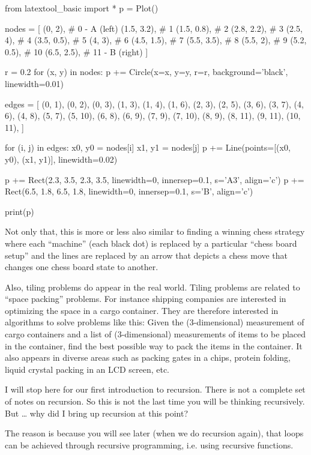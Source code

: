 \begin{python}
from latextool_basic import *
p = Plot()

nodes = [
    (0, 2),      # 0 - A (left)
    (1.5, 3.2),  # 1
    (1.5, 0.8),  # 2
    (2.8, 2.2),  # 3
    (2.5, 4),    # 4
    (3.5, 0.5),  # 5
    (4, 3),      # 6
    (4.5, 1.5),  # 7
    (5.5, 3.5),  # 8
    (5.5, 2),    # 9
    (5.2, 0.5),  # 10
    (6.5, 2.5),  # 11 - B (right)
]

r = 0.2
for (x, y) in nodes:
    p += Circle(x=x, y=y, r=r, background='black', linewidth=0.01)

edges = [
    (0, 1), (0, 2), (0, 3),
    (1, 3), (1, 4), (1, 6),
    (2, 3), (2, 5),
    (3, 6), (3, 7),
    (4, 6), (4, 8),
    (5, 7), (5, 10),
    (6, 8), (6, 9),
    (7, 9), (7, 10),
    (8, 9), (8, 11),
    (9, 11),
    (10, 11),
]

for (i, j) in edges:
    x0, y0 = nodes[i]
    x1, y1 = nodes[j]
    p += Line(points=[(x0, y0), (x1, y1)], linewidth=0.02)

p += Rect(2.3, 3.5, 2.3, 3.5, linewidth=0, innersep=0.1, s='A3', align='c')
p += Rect(6.5, 1.8, 6.5, 1.8, linewidth=0, innersep=0.1, s='B', align='c')

print(p)
\end{python}


Not only that, this is more or less also similar to finding a winning
chess strategy where each ``machine'' (each black dot) is replaced by a
particular ``chess board setup'' and the lines are replaced by an arrow
that depicts a chess move that changes one chess board state to another.

Also, tiling problems do appear in the real world. Tiling problems are
related to ``space packing'' problems. For instance shipping companies
are interested in optimizing the space in a cargo container. They are
therefore interested in algorithms to solve problems like this: Given
the (3-dimensional) measurement of cargo containers and a list of
(3-dimensional) measurements of items to be placed in the container,
find the best possible way to pack the items in the container. It also
appears in diverse areas such as packing gates in a chips, protein
folding, liquid crystal packing in an LCD screen, etc.

I will stop here for our first introduction to recursion. There is not a
complete set of notes on recursion. So this is not the last time you
will be thinking recursively. But \ldots{} why did I bring up recursion
at this point?

The reason is because you will see later (when we do recursion again),
that loops can be achieved through recursive programming, i.e. using
recursive functions.



